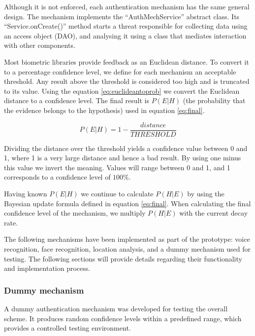 Although it is not enforced, each authentication mechanism has the same general design. The mechanism implements the ``AuthMechService'' abstract class. Its ``Service.onCreate()'' method starts a threat responsible for collecting data using an access object (DAO), and analysing it using a class that mediates interaction with other components. 

Most biometric libraries provide feedback as an Euclidean distance. To convert it to a percentage confidence level, we define for each mechanism an acceptable threshold. Any result above the threshold is considered too high and is truncated to its value. Using the equation \ref{eq:euclideantoprob} we convert the Euclidean distance to a confidence level. The final result is $P(E|H)$ (the probability that the evidence belongs to the hypothesis) used in equation \ref{eq:final}.

\begin{equation} 
\label{eq:euclideantoprob}
P(E|H) = 1 - \frac{distance}{THRESHOLD}
\end{equation}

Dividing the distance over the threshold yields a confidence value between 0 and 1, where 1 is a very large distance and hence a bad result. By using one minus this value we invert the meaning. Values will range between 0 and 1, and 1 corresponds to a confidence level of $100\%$. 

Having known $P(E|H)$ we continue to calculate $P(H|E)$ by using the Bayesian update formula defined in equation \ref{eq:final}. When calculating the final confidence level of the mechanism, we multiply $P(H|E)$ with the current decay rate.

The following mechanisms have been implemented as part of the prototype: voice recognition, face recognition, location analysis, and a dummy mechanism used for testing. The following sections will provide details regarding their functionality and implementation process.

\subsubsection{Dummy mechanism}
A dummy authentication mechanism was developed for testing the overall scheme. It produces random confidence levels within a predefined range, which provides a controlled testing environment.

